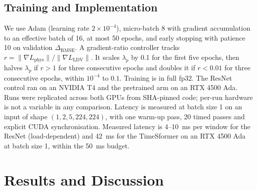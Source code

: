 \documentclass[conference]{IEEEtran}
\begin{document}
\subsection{Training and Implementation}
We use Adam (learning rate $2\times10^{-4}$), micro-batch 8 with gradient accumulation to an effective batch of 16, at most 50 epochs, and early stopping with patience 10 on validation $\Delta_{\mathrm{RMSE}}$. A gradient-ratio controller tracks $r = \lVert\nabla L_{\mathrm{phys}}\rVert/\lVert\nabla L_{\mathrm{LDV}}\rVert$. It scales $\lambda_p$ by 0.1 for the first five epochs, then halves $\lambda_p$ if $r > 1$ for three consecutive epochs and doubles it if $r < 0.01$ for three consecutive epochs, within $10^{-4}$ to $0.1$. Training is in full fp32. The ResNet control ran on an NVIDIA T4 and the pretrained arm on an RTX 4500 Ada. Runs were replicated across both GPUs from SHA-pinned code; per-run hardware is not a variable in any comparison. Latency is measured at batch size 1 on an input of shape $(1, 2, 5, 224, 224)$, with one warm-up pass, 20 timed passes and explicit CUDA synchronisation. Measured latency is 4--10~ms per window for the ResNet (load-dependent) and 42~ms for the TimeSformer on an RTX 4500 Ada at batch size 1, within the 50~ms budget.

\section{Results and Discussion}
\end{document}
